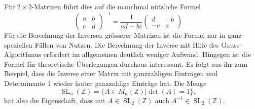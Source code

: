 Für $2\times2$-Matrizen führt dies auf die manchmal nützliche
Formel
\[
\begin{pmatrix}
a&b\\c&d
\end{pmatrix}^{-1}
=
\frac1{ad-bc}\begin{pmatrix}
d&-b\\-c&a
\end{pmatrix}
\]
Für die Berechnung der Inversen grösserer Matrizen ist die Formel
nur in ganz speziellen Fällen von Nutzen.
Die Berechnung der Inverse
mit Hilfe des Gauss-Algorithmus erfordert im allgemeinen deutlich weniger
Aufwand.
Hingegen ist die Formel für theoretische Überlegungen durchaus
interessant.
Es folgt aus ihr zum Beispiel, dass die Inverse einer
Matrix mit ganzzahligen Einträgen und Determinante $1$ wieder
lauter ganzzahlige Einträge hat.
Die Menge
\[
\operatorname{SL}_n(\mathbb Z)=\{A\in M_{n}(\mathbb Z)|\det(A)=1\},
\]
hat also die Eigenschaft, dass mit $A\in\operatorname{SL}_2(\mathbb Z)$ 
auch $A^{-1}\in\operatorname{SL}_2(\mathbb Z)$.

